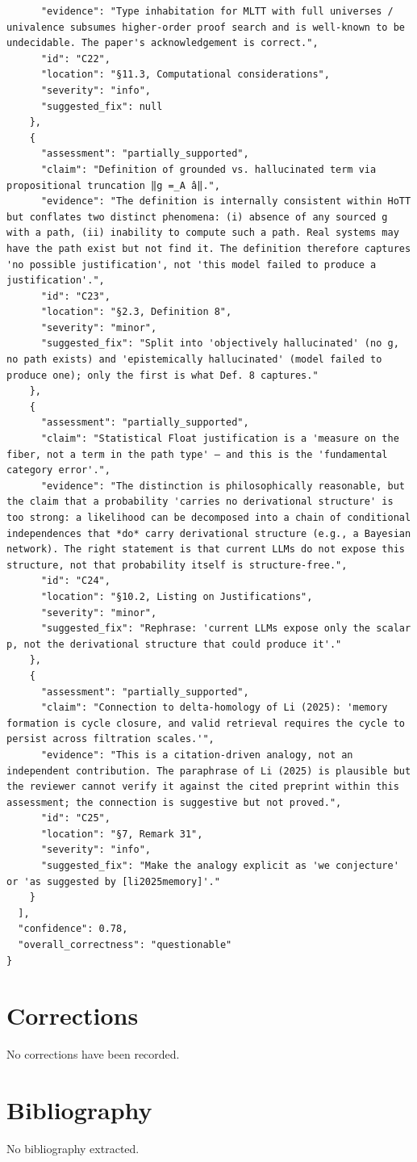 \documentclass[11pt]{article}
\begin{document}
\begin{verbatim}
      "evidence": "Type inhabitation for MLTT with full universes / univalence subsumes higher-order proof search and is well-known to be undecidable. The paper's acknowledgement is correct.",
      "id": "C22",
      "location": "§11.3, Computational considerations",
      "severity": "info",
      "suggested_fix": null
    },
    {
      "assessment": "partially_supported",
      "claim": "Definition of grounded vs. hallucinated term via propositional truncation ‖g =_A â‖.",
      "evidence": "The definition is internally consistent within HoTT but conflates two distinct phenomena: (i) absence of any sourced g with a path, (ii) inability to compute such a path. Real systems may have the path exist but not find it. The definition therefore captures 'no possible justification', not 'this model failed to produce a justification'.",
      "id": "C23",
      "location": "§2.3, Definition 8",
      "severity": "minor",
      "suggested_fix": "Split into 'objectively hallucinated' (no g, no path exists) and 'epistemically hallucinated' (model failed to produce one); only the first is what Def. 8 captures."
    },
    {
      "assessment": "partially_supported",
      "claim": "Statistical Float justification is a 'measure on the fiber, not a term in the path type' — and this is the 'fundamental category error'.",
      "evidence": "The distinction is philosophically reasonable, but the claim that a probability 'carries no derivational structure' is too strong: a likelihood can be decomposed into a chain of conditional independences that *do* carry derivational structure (e.g., a Bayesian network). The right statement is that current LLMs do not expose this structure, not that probability itself is structure-free.",
      "id": "C24",
      "location": "§10.2, Listing on Justifications",
      "severity": "minor",
      "suggested_fix": "Rephrase: 'current LLMs expose only the scalar p, not the derivational structure that could produce it'."
    },
    {
      "assessment": "partially_supported",
      "claim": "Connection to delta-homology of Li (2025): 'memory formation is cycle closure, and valid retrieval requires the cycle to persist across filtration scales.'",
      "evidence": "This is a citation-driven analogy, not an independent contribution. The paraphrase of Li (2025) is plausible but the reviewer cannot verify it against the cited preprint within this assessment; the connection is suggestive but not proved.",
      "id": "C25",
      "location": "§7, Remark 31",
      "severity": "info",
      "suggested_fix": "Make the analogy explicit as 'we conjecture' or 'as suggested by [li2025memory]'."
    }
  ],
  "confidence": 0.78,
  "overall_correctness": "questionable"
}
\end{verbatim}

\section*{Corrections}
No corrections have been recorded.

\section*{Bibliography}
No bibliography extracted.

% 
% 
\end{document}
